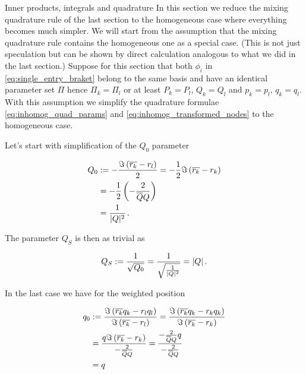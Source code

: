 \begin{chapter}{Inner products, integrals and quadrature}
In this section we reduce the mixing quadrature rule of the last section to the
homogeneous case where everything becomes much simpler.
We will start from the assumption that the mixing quadrature rule contains the
homogeneous one as a special case. (This is not just speculation but can be shown
by direct calculation analogous to what we did in the last section.) Suppose for
this section that both $\phi_i$ in \eqref{eq:single_entry_braket} belong to the
same basis and have an identical parameter set $\Pi$ hence $\Pi_k = \Pi_l$ or at
least $P_k = P_l$, $Q_k = Q_l$ and $p_k = p_l$, $q_k = q_l$. With this assumption
we simplify the quadrature formulae \eqref{eq:inhomog_quad_params} and
\eqref{eq:inhomog_transformed_nodes} to the homogeneous case.

Let's start with simplification of the $Q_0$ parameter

\begin{equation}
\begin{split}
  Q_0 & := -\frac{\Im \left(\overline{r_k}-r_l\right)}{2}
        = -\frac{1}{2} \Im \left(\overline{r_k}-r_k\right) \\
      & = - \frac{1}{2} \left( - \frac{2}{\overline{Q}Q}\right) \\
      & = \frac{1}{|Q|^2} \,.
\end{split}
\end{equation}

The parameter $Q_S$ is then as trivial as

\begin{equation}
  Q_S := \frac{1}{\sqrt{Q_0}} = \frac{1}{\sqrt{\frac{1}{|Q|^2}}} = |Q| \,.
\end{equation}

In the last case we have for the weighted position

\begin{equation}
\begin{split}
  q_0 & := \frac{\Im \left(\overline{r_k}q_k-r_l q_l\right)}{\Im \left(\overline{r_k}-r_l\right)}
        = \frac{\Im \left(\overline{r_k}q_k-r_k q_k\right)}{\Im \left(\overline{r_k}-r_k\right)} \\
      & = \frac{q \Im \left(\overline{r_k}-r_k\right)}{-\frac{2}{\overline{Q}Q}}
        = \frac{-\frac{2}{\overline{Q}Q}q}{-\frac{2}{\overline{Q}Q}} \\
      & = q
\end{split}
\end{equation}


\end{chapter}
